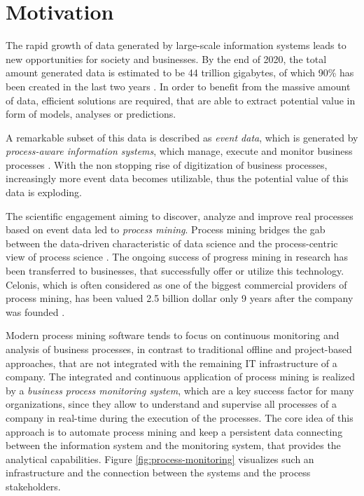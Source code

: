 
\section{Motivation}

The rapid growth of data generated by large-scale information systems leads to new opportunities for  society and businesses. 
By the end of 2020, the total amount generated data is estimated to be 44 trillion gigabytes, of which 90\% has been created in the last two years \cite{datagrowth}.
In order to benefit from the massive amount of data, efficient solutions are required, that are able to extract potential value in form of models, analyses or predictions.

A remarkable subset of this data is described as \textit{event data}, which is generated by \textit{process-aware information systems}, which manage, execute and monitor business processes \cite{DBLP:journals/topnoc/Aalst09}.
With the non stopping rise of digitization of business processes, increasingly more event data becomes utilizable, thus the potential value of this data is exploding.

The scientific engagement aiming to discover, analyze and improve real processes based on event data led to \textit{process mining}. Process mining bridges the gab between the data-driven characteristic of data science and the process-centric view of process science \cite{DBLP:books/sp/Aalst16}.
The ongoing success of progress mining in research has been transferred to businesses, that successfully offer or utilize this technology.
Celonis, which is often considered as one of the biggest commercial providers of process mining, has been valued 2.5 billion dollar only 9 years after the company was founded \cite{celonis}.

Modern process mining software tends to focus on continuous monitoring and analysis of business processes, in contrast to traditional offline and project-based approaches, that are not integrated with the remaining IT infrastructure of a company.
The integrated and continuous application of process mining is realized by a \textit{business process monitoring system}, which are a key success factor for many organizations, since they allow to understand and supervise all processes of a company in real-time during the execution of the processes.
The core idea of this approach is to automate process mining and keep a persistent data connecting between the information system and the monitoring system, that provides the analytical capabilities.
Figure \ref{fig:process-monitoring} visualizes such an infrastructure and the connection between the systems and the process stakeholders.


